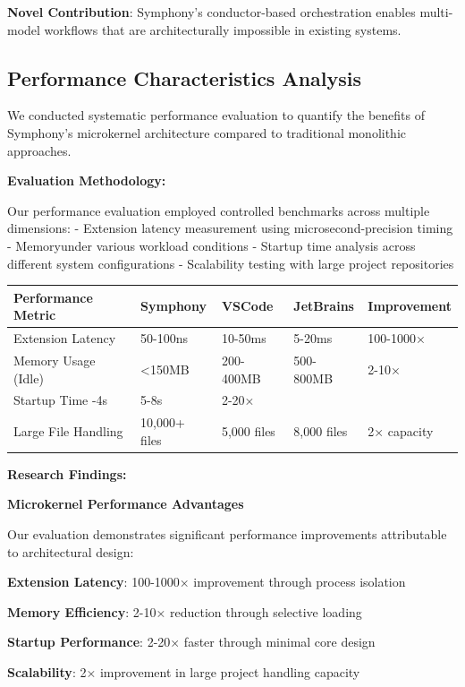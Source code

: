 \textbf{Novel Contribution}: Symphony's conductor-based orchestration enables multi-model workflows that are architecturally impossible in existing systems.

\subsection{Performance Characteristics Analysis}
\label{subsec:feature-performance-analysis}

We conducted systematic performance evaluation to quantify the benefits of Symphony's microkernel architecture compared to traditional monolithic approaches.

\textbf{Evaluation Methodology:}

Our performance evaluation employed controlled benchmarks across multiple dimensions:
- Extension latency measurement using microsecond-precision timing
- Memoryunder various workload conditions  
- Startup time analysis across different system configurations
- Scalability testing with large project repositories

\begin{center}
\begin{tabular}{@{}p{3.5cm}p{2cm}p{2cm}p{2cm}p{2cm}@{}}
\toprule
\textbf{Performance Metric} & \textbf{Symphony} & \textbf{VSCode} & \textbf{JetBrains} & \textbf{Improvement} \\
\midrule
Extension Latency & 50-100ns & 10-50ms & 5-20ms & 100-1000× \\
Memory Usage (Idle) & <150MB & 200-400MB & 500-800MB & 2-10× \\
Startup Time -4s & 5-8s & 2-20× \\
Large File Handling & 10,000+ files & 5,000 files & 8,000 files & 2× capacity \\
\bottomrule
\end{tabular}
\label{tab:performance-results}
\end{center}

\textbf{Research Findings:}

\begin{successbox}
\textbf{Microkernel Performance Advantages}

Our evaluation demonstrates significant performance improvements attributable to architectural design:
\begin{compactlist}
    \item \textbf{Extension Latency}: 100-1000× improvement through process isolation
    \item \textbf{Memory Efficiency}: 2-10× reduction through selective loading
    \item \textbf{Startup Performance}: 2-20× faster through minimal core design
    \item \textbf{Scalability}: 2× improvement in large project handling capacity
\end{compactlist}
\end{successbox}

